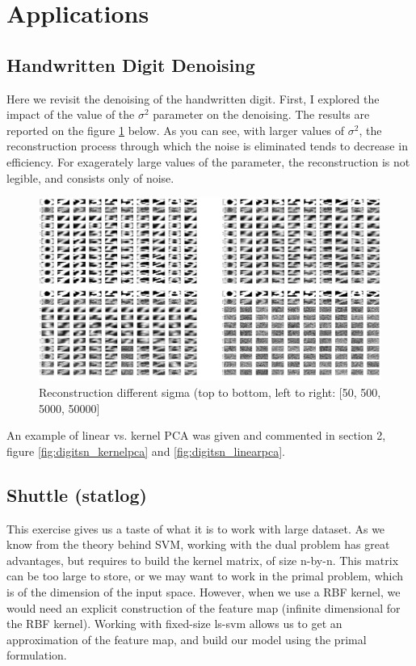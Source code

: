 \documentclass[11pt, a4paper]{article}
\begin{document}
\section{Applications}

\subsection{Handwritten Digit Denoising}

Here we revisit the denoising of the handwritten digit. First, I
explored the impact of the value of the $\sigma^2$ parameter on the
denoising. The results are reported on the figure
\ref{fig:nndigits_all} below. As you can see, with larger values of
$\sigma^2$, the reconstruction process through which the noise is
eliminated tends to decrease in efficiency. For exagerately large
values of the parameter, the reconstruction is not legible, and
consists only of noise.

\begin{figure}[H]
  \centering
  \includegraphics[scale=.15]{nndigits_all.png}
  \caption{Reconstruction different sigma (top to bottom, left to
    right: [50, 500, 5000, 50000]}
  \label{fig:nndigits_all}
\end{figure}

An example of linear vs. kernel PCA was given and commented in section
2, figure \ref{fig:digitsn_kernelpca} and \ref{fig:digitsn_linearpca}. 

\subsection{Shuttle (statlog)}

This exercise gives us a taste of what it is to work with large
dataset. As we know from the theory behind SVM, working with the dual
problem has great advantages, but requires to build the kernel matrix,
of size n-by-n. This matrix can be too large to store, or we may want
to work in the primal problem, which is of the dimension of the input
space. However, when we use a RBF kernel, we would need an explicit
construction of the feature map (infinite dimensional for the RBF
kernel). Working with fixed-size ls-svm allows us to get an
approximation of the feature map, and build our model using the primal
formulation.
\end{document}
